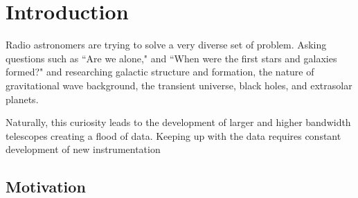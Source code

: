 \chapter{Introduction}
Radio astronomers are trying to solve a very diverse set of problem.
Asking questions such as ``Are we alone," and ``When were the first stars and galaxies formed?" and researching galactic structure and formation, the nature of gravitational wave background, the transient universe, black holes, and extrasolar planets.

Naturally, this curiosity leads to the development of larger and higher bandwidth telescopes creating a flood of data.
Keeping up with the data requires constant development of new instrumentation 


\section{Motivation}

